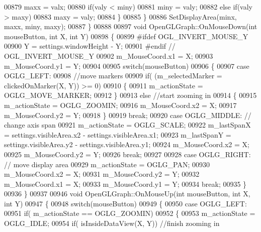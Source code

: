 \begin{DoxyCode}
{{{{{{{{{00879                 maxx = valx;
00880             \textcolor{keywordflow}{if}(valy < miny)
00881                 miny = valy;
00882             \textcolor{keywordflow}{else} \textcolor{keywordflow}{if}(valy > maxy)
00883                 maxy = valy;
00884         \}
00885     \}
00886     SetDisplayArea(minx, maxx, miny, maxy);
00887 \}
00888 
00897 \textcolor{keywordtype}{void} OpenGLGraph::OnMouseDown(\textcolor{keywordtype}{int} mouseButton, \textcolor{keywordtype}{int} X, \textcolor{keywordtype}{int} Y)
00898 \{
00899 \textcolor{preprocessor}{#ifdef OGL\_INVERT\_MOUSE\_Y}
00900     Y = settings.windowHeight - Y;
00901 \textcolor{preprocessor}{#endif // OGL\_INVERT\_MOUSE\_Y}
00902     m_MouseCoord.x1 = X;
00903     m_MouseCoord.y1 = Y;
00904 
00905     \textcolor{keywordflow}{switch}(mouseButton)
00906     \{
00907     \textcolor{keywordflow}{case} OGLG_LEFT:
00908         \textcolor{comment}{//move markers}
00909         \textcolor{keywordflow}{if}( (m_selectedMarker = clickedOnMarker(X, Y)) >= 0)
00910         \{
00911             m_actionState = OGLG_MOVE_MARKER;
00912         \}
00913         \textcolor{keywordflow}{else} \textcolor{comment}{//start zooming in}
00914         \{
00915             m_actionState = OGLG_ZOOMIN;
00916             m_MouseCoord.x2 = X;
00917             m_MouseCoord.y2 = Y;
00918         \}
00919         \textcolor{keywordflow}{break};
00920     \textcolor{keywordflow}{case} OGLG_MIDDLE: \textcolor{comment}{// change axis span}
00921         m_actionState = OGLG_SCALE;
00922         m_lastSpanX = settings.visibleArea.x2 - settings.visibleArea.x1;
00923         m_lastSpanY = settings.visibleArea.y2 - settings.visibleArea.y1;
00924         m_MouseCoord.x2 = X;
00925         m_MouseCoord.y2 = Y;
00926         \textcolor{keywordflow}{break};
00927 
00928     \textcolor{keywordflow}{case} OGLG_RIGHT: \textcolor{comment}{// move display area}
00929         m_actionState = OGLG_PAN;
00930         m_MouseCoord.x2 = X;
00931         m_MouseCoord.y2 = Y;
00932         m_MouseCoord.x1 = X;
00933         m_MouseCoord.y1 = Y;
00934         \textcolor{keywordflow}{break};
00935     \}
00936 \}
00937 
00946 \textcolor{keywordtype}{void} OpenGLGraph::OnMouseUp(\textcolor{keywordtype}{int} mouseButton, \textcolor{keywordtype}{int} X, \textcolor{keywordtype}{int} Y)
00947 \{
00948     \textcolor{keywordflow}{switch}(mouseButton)
00949     \{
00950     \textcolor{keywordflow}{case} OGLG_LEFT:
00951         \textcolor{keywordflow}{if}( m_actionState == OGLG_ZOOMIN)
00952         \{
00953             m_actionState = OGLG_IDLE;
00954             \textcolor{keywordflow}{if}( isInsideDataView(X, Y))         \textcolor{comment}{//finish zooming in}
}}}}}}}}}
\end{DoxyCode}

